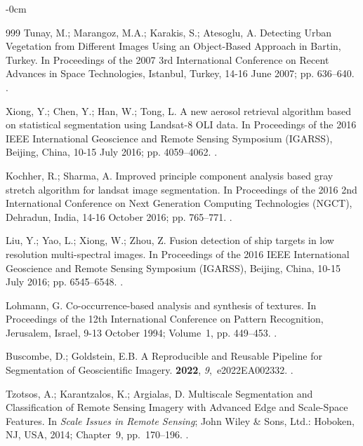 \documentclass[analytics,article,accept,pdftex,moreauthors]{Definitions/mdpi}
\begin{document}
\begin{adjustwidth}{-\extralength}{0cm}
\begin{thebibliography}{999}
Tunay, M.; Marangoz, M.A.; Karakis, S.; Atesoglu, A.
\newblock Detecting Urban Vegetation from Different Images Using an
  Object-Based Approach in Bartin, Turkey.
\newblock In Proceedings of the 2007 3rd International Conference on Recent
  Advances in Space Technologies,  Istanbul, Turkey, 14-16 June 2007; pp. 636--640.
.

Xiong, Y.; Chen, Y.; Han, W.; Tong, L.
\newblock A new aerosol retrieval algorithm based on statistical segmentation
  using Landsat-8 OLI data.
\newblock In Proceedings of the 2016 IEEE International Geoscience and Remote
  Sensing Symposium (IGARSS),  Beijing, China, 10-15 July 2016; pp. 4059--4062.
.

Kochher, R.; Sharma, A.
\newblock Improved principle component analysis based gray stretch algorithm
  for landsat image segmentation.
\newblock In Proceedings of the 2016 2nd International Conference on Next
  Generation Computing Technologies (NGCT), Dehradun, India, 14-16 October 2016; pp. 765--771.
.

Liu, Y.; Yao, L.; Xiong, W.; Zhou, Z.
\newblock Fusion detection of ship targets in low resolution multi-spectral
  images.
\newblock In Proceedings of the 2016 IEEE International Geoscience and Remote
  Sensing Symposium (IGARSS), Beijing, China, 10-15 July 2016; pp. 6545--6548.
.

Lohmann, G.
\newblock Co-occurrence-based analysis and synthesis of textures.
\newblock In Proceedings of the 12th International Conference on
  Pattern Recognition, Jerusalem, Israel, 9-13 October 1994; Volume~1, pp. 449--453.
.

Buscombe, D.; Goldstein, E.B.
\newblock A Reproducible and Reusable Pipeline for Segmentation of
  Geoscientific Imagery.
 {\bf 2022}, {\em 9},~e2022EA002332.
.

Tzotsos, A.; Karantzalos, K.; Argialas, D. Multiscale Segmentation and
  Classification of Remote Sensing Imagery with Advanced Edge and Scale-Space
  Features.
\newblock In {\em Scale Issues in Remote Sensing}; John Wiley \& Sons, Ltd.: Hoboken, NJ, USA, %
  2014; Chapter~9, pp.~170--196.
.


\end{thebibliography}
\end{adjustwidth}
\end{document}
